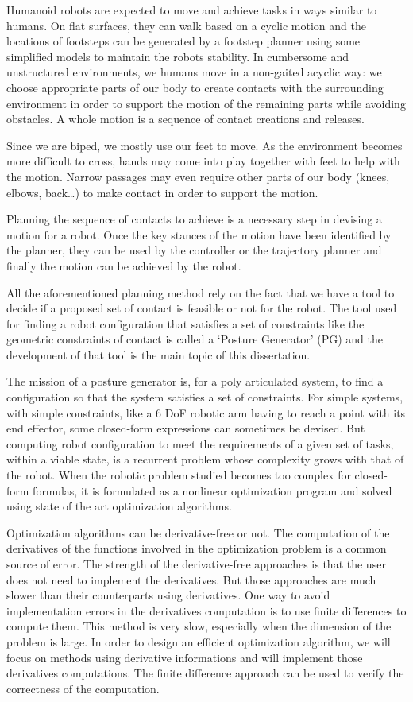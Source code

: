 Humanoid robots are expected to move and achieve tasks in ways similar to humans.
On flat surfaces, they can walk based on a cyclic motion and the locations of footsteps can be generated by a footstep planner using some simplified models to maintain the robots stability.
In cumbersome and unstructured environments, we humans move in a non-gaited acyclic way: we choose appropriate parts of our body to create contacts with the surrounding environment in order to support the motion of the remaining parts while avoiding obstacles.
A whole motion is a sequence of contact creations and releases.

Since we are biped, we mostly use our feet to move.
As the environment becomes more difficult to cross, hands may come into play together with feet to help with the motion.
Narrow passages may even require other parts of our body (knees, elbows, back\dots) to make contact in order to support the motion.

Planning the sequence of contacts to achieve is a necessary step in devising a motion for a robot.
Once the key stances of the motion have been identified by the planner, they can be used by the controller or the trajectory planner and finally the motion can be achieved by the robot.

All the aforementioned planning method rely on the fact that we have a tool to decide if a proposed set of contact is feasible or not for the robot.
The tool used for finding a robot configuration that satisfies a set of constraints like the geometric constraints of contact is called a `Posture Generator' (PG) and the development of that tool is the main topic of this dissertation.

The mission of a posture generator is, for a poly articulated system, to find a configuration so that the system satisfies a set of constraints.
For simple systems, with simple constraints, like a 6 DoF robotic arm having to reach a point with its end effector, some closed-form expressions can sometimes be devised.
But computing robot configuration to meet the requirements of a given set of tasks, within a viable state, is a recurrent problem whose complexity grows with that of the robot.
When the robotic problem studied becomes too complex for closed-form formulas, it is formulated as a nonlinear optimization program and solved using state of the art optimization algorithms.

Optimization algorithms can be derivative-free or not.
The computation of the derivatives of the functions involved in the optimization problem is a common source of error.
The strength of the derivative-free approaches is that the user does not need to implement the derivatives.
But those approaches are much slower than their counterparts using derivatives.
One way to avoid implementation errors in the derivatives computation is to use finite differences to compute them.
This method is very slow, especially when the dimension of the problem is large.
In order to design an efficient optimization algorithm, we will focus on methods using derivative informations and will implement those derivatives computations.
The finite difference approach can be used to verify the correctness of the computation.

